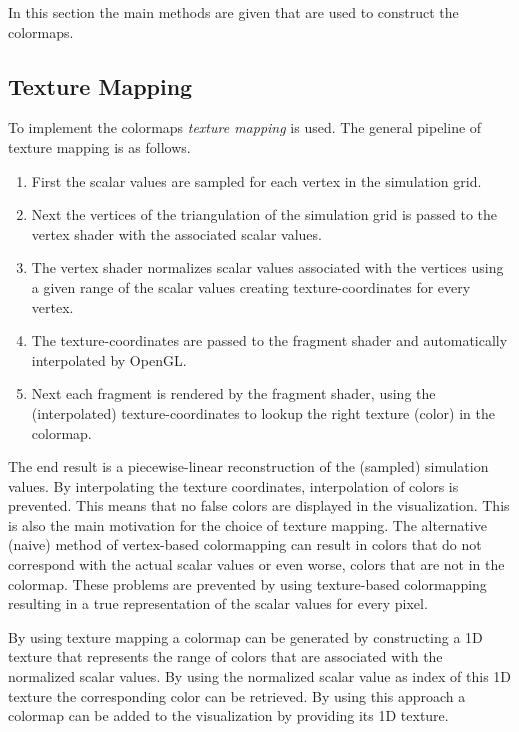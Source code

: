 In this section the main methods are given that are used to construct the colormaps.


\subsection{Texture Mapping} %
\label{sub:texture_mapping}
To implement the colormaps \emph{texture mapping} is used. The general pipeline of texture mapping is as follows.
\begin{enumerate}
	\item First the scalar values are sampled for each vertex in the simulation grid.
	\item Next the vertices of the triangulation of the simulation grid is passed to the vertex shader with the associated scalar values.
	\item The vertex shader normalizes scalar values associated with the vertices using a given range of the scalar values creating texture-coordinates for every vertex.
	\item The texture-coordinates are passed to the fragment shader and automatically interpolated by OpenGL.
	\item Next each fragment is rendered by the fragment shader, using the (interpolated) texture-coordinates to lookup the right texture (color) in the colormap.
\end{enumerate}
The end result is a piecewise-linear reconstruction of the (sampled) simulation values. By interpolating the texture coordinates, interpolation of colors is prevented.  This means that no false colors are displayed in the visualization. This is also the main motivation for the choice of texture mapping. The alternative (naive) method of vertex-based colormapping can result in colors that do not correspond with the actual scalar values or even worse, colors that are not in the colormap. These problems are prevented by using texture-based colormapping resulting in a true representation of the scalar values for every pixel.

By using texture mapping a colormap can be generated by constructing a 1D texture that represents the range of colors that are associated with the normalized scalar values. By using the normalized scalar value as index of this 1D texture the corresponding color can be retrieved. By using this approach a colormap can be added to the visualization by providing its 1D texture.

